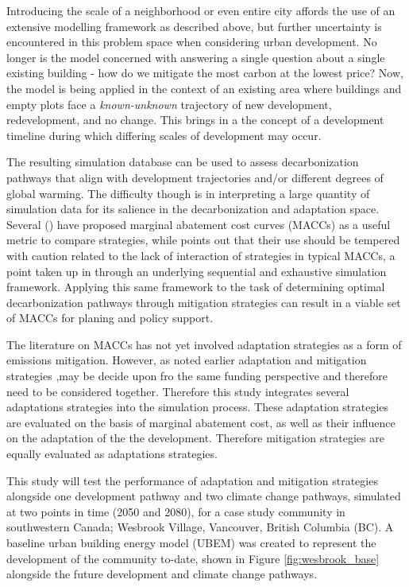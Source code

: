\documentclass[twocolumn, a4paper,10pt]{article}
\begin{document}
Introducing the scale of a neighborhood or even entire city affords the use of an extensive modelling framework as described above, but further uncertainty is encountered in this problem space when considering urban development. No longer is the model concerned with answering a single question about a single existing building - how do we mitigate the most carbon at the lowest price? Now, the model is being applied in the context of an existing area where buildings and empty plots face a \textit{known-unknown} trajectory of new development, redevelopment, and no change. This brings in a the concept of a development timeline during which differing scales of development may occur.

The resulting simulation database can be used to assess decarbonization pathways that align with development trajectories and/or different degrees of global warming. The difficulty though is in interpreting a large quantity of simulation data for its salience in the decarbonization and adaptation space. Several (\citep{afshari_life-cycle_2014,ibrahim_methodology_2016}) have proposed marginal abatement cost curves (MACCs) as a useful metric to compare strategies, while \citet{kesicki_marginal_nodate} points out that their use should be tempered with caution related to the lack of interaction of strategies in typical MACCs, a point taken up in \citet{rysanek_using_2013} through an underlying sequential and exhaustive simulation framework. Applying this same framework to the task of determining optimal decarbonization pathways through mitigation strategies can result in a viable set of MACCs for planing and policy support.

The literature on MACCs has not yet involved adaptation strategies as a form of emissions mitigation. However, as noted earlier adaptation and mitigation strategies ,may be decide upon fro the same funding perspective and therefore need to be considered together. Therefore this study integrates several adaptations strategies into the simulation process. These adaptation strategies are evaluated on the basis of marginal abatement cost, as well as their influence on the adaptation of the the development. Therefore mitigation strategies are equally evaluated as adaptations strategies. 

This study will test the performance of adaptation and mitigation strategies alongside one development pathway and two climate change pathways, simulated at two points in time (2050 and 2080), for a case study community in southwestern Canada; Wesbrook Village, Vancouver, British Columbia (BC). A baseline urban building energy model (UBEM) was created to represent the development of the community to-date, shown in Figure \ref{fig:wesbrook_base} alongside the future development and climate change pathways.
\end{document}
